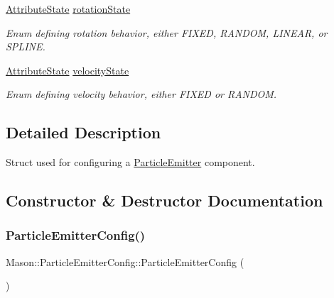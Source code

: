 \begin{DoxyCompactItemize}
\hyperlink{namespace_mason_aefc2ce7d9295b57af46ab6c8ebfc32f7}{Attribute\+State} \hyperlink{struct_mason_1_1_particle_emitter_config_a35b60fea30c8a07adcfc77a3c30e1546}{rotation\+State}
\begin{DoxyCompactList}\small\item\em Enum defining rotation behavior, either F\+I\+X\+ED, R\+A\+N\+D\+OM, L\+I\+N\+E\+AR, or S\+P\+L\+I\+NE. \end{DoxyCompactList}\item 
\hyperlink{namespace_mason_aefc2ce7d9295b57af46ab6c8ebfc32f7}{Attribute\+State} \hyperlink{struct_mason_1_1_particle_emitter_config_a449a7ec64ad8d9f9be405f1beb5ee507}{velocity\+State}
\begin{DoxyCompactList}\small\item\em Enum defining velocity behavior, either F\+I\+X\+ED or R\+A\+N\+D\+OM. \end{DoxyCompactList}\end{DoxyCompactItemize}


\subsection{Detailed Description}
Struct used for configuring a \hyperlink{class_mason_1_1_particle_emitter}{Particle\+Emitter} component. 

\subsection{Constructor \& Destructor Documentation}
\hypertarget{struct_mason_1_1_particle_emitter_config_a317aa2e9d325160e20fd1bbefdc244f5}{}\label{struct_mason_1_1_particle_emitter_config_a317aa2e9d325160e20fd1bbefdc244f5} 
\subsubsection{\texorpdfstring{Particle\+Emitter\+Config()}{ParticleEmitterConfig()}\hspace{0.1cm}{\footnotesize\ttfamily [1/2]}}
{\footnotesize\ttfamily Mason\+::\+Particle\+Emitter\+Config\+::\+Particle\+Emitter\+Config (\begin{DoxyParamCaption}{ }\end{DoxyParamCaption})\hspace{0.3cm}{\ttfamily [inline]}}



